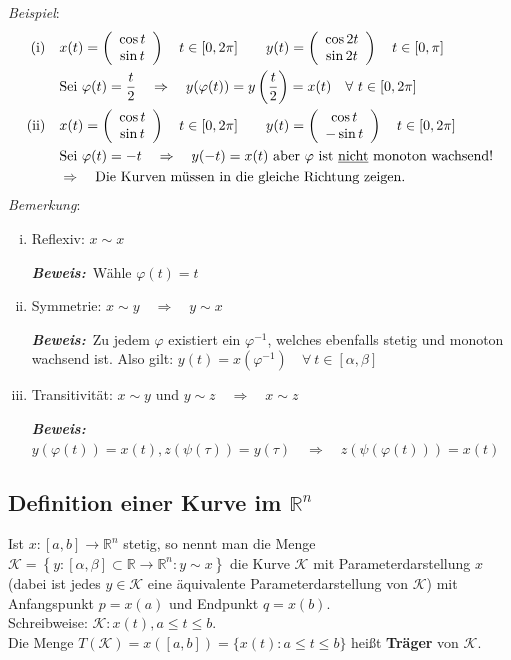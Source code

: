 \documentclass[11pt,a4paper]{book}
\newcommand {\R}	{\mathbb{R}}
\newcommand {\Rn}	{\mathbb{R}^n}
\newcommand{\1}    	{\mathbbm{1}}
\newcommand{\Kurve}	{{\mathcal{K}}}
\newcommand{\Beweis}[1][Beweis]
{\begin{mdframed}[backgroundcolor=gray!10,linewidth=0pt]\noindent\textit{\textbf{{#1}:}}~}
\newcommand{\QED}	{\end{mdframed}}
\begin{document}
\noindent
\textit{Beispiel}:
\begin{align*}
	\textrm{(i)} \quad & 
	x(t) = \left( \begin{array}{c}
		\cos t \\
		\sin t	
	\end{array} \right) \quad
	t \in [0,2\pi] \qquad
	y(t) = \left( \begin{array}{c}
		\cos 2t \\
		\sin 2t	
	\end{array} \right) \quad
	t \in [0,\pi] \\
	& \textrm{Sei } \varphi(t) = \frac{t}{2} \quad \Rightarrow \quad
	y(\varphi(t)) = y\left(\frac{t}{2}\right) = x(t) \quad \forall~ t \in [0,2\pi] \\
	\textrm{(ii)} \quad & 
	x(t) = \left( \begin{array}{c}
		\cos t \\
		\sin t	
	\end{array} \right) \quad
	t \in [0,2\pi] \qquad
	y(t) = \left( \begin{array}{c}
		\cos t \\
		-\sin t	
	\end{array} \right) \quad
	t \in [0,2\pi] \\
	&\textrm{Sei } \varphi(t) = -t \quad \Rightarrow \quad
	y(-t) = x(t) \textrm{ aber } \varphi \textrm{ ist \underline{nicht} monoton wachsend!} \\
	&\Rightarrow\quad \textrm{Die Kurven müssen in die gleiche Richtung zeigen.}
\end{align*}
\textit{Bemerkung}:
\begin{enumerate}[(i)]
	\item Reflexiv: \(x \sim x\)
	\Beweis Wähle \(\varphi(t) = t\) \QED
	\item Symmetrie: \(x \sim y \quad\Rightarrow\quad y \sim x \)
	\Beweis Zu jedem \(\varphi\) existiert ein \(\varphi^{-1}\), welches ebenfalls stetig und monoton wachsend ist. Also gilt: \(y(t) = x\left( \varphi^{-1} \right) \quad \forall~ t \in [\alpha,\beta]\) \QED
	\item Transitivität: \(x \sim y\) und \(y \sim z \quad\Rightarrow\quad x \sim z\)
	\Beweis \(y(\varphi(t)) = x(t), z(\psi(\tau)) = y(\tau) \quad\Rightarrow\quad z\left( \psi\left( \varphi(t) \right) \right) = x(t) \) \QED
\end{enumerate}

\subsection{Definition einer Kurve im \(\Rn\)}
Ist \(x: [a,b] \rightarrow \Rn\) stetig, so nennt man die Menge \(\Kurve = \left\{ y: [\alpha,\beta] \subset \R \rightarrow \Rn : y \sim x \right\}\) die Kurve \(\Kurve\) mit Parameterdarstellung \(x\) (dabei ist jedes \(y \in \Kurve\) eine äquivalente Parameterdarstellung von \(\Kurve\)) mit Anfangspunkt \(p = x(a)\) und Endpunkt \(q = x(b)\).\\
Schreibweise: \(\Kurve : x(t), a \leqslant t \leqslant b\).\\
Die Menge \(T(\Kurve) = x([a,b]) = \{ x(t) : a \leqslant t \leqslant b \}\) heißt \textbf{Träger} von \(\Kurve\).\\
\end{document}
